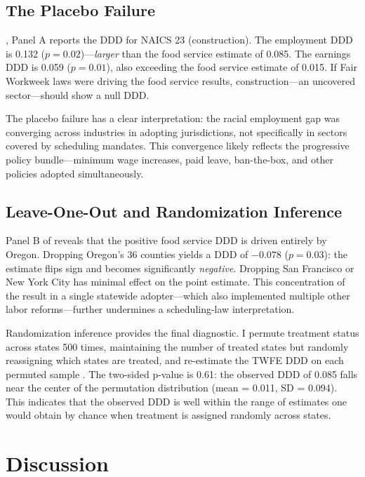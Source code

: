 \documentclass[12pt]{article}
\begin{document}


\subsection{The Placebo Failure}

, Panel A reports the DDD for NAICS 23 (construction). The employment DDD is 0.132 ($p = 0.02$)---\textit{larger} than the food service estimate of 0.085. The earnings DDD is 0.059 ($p = 0.01$), also exceeding the food service estimate of 0.015. If Fair Workweek laws were driving the food service results, construction---an uncovered sector---should show a null DDD.

The placebo failure has a clear interpretation: the racial employment gap was converging across industries in adopting jurisdictions, not specifically in sectors covered by scheduling mandates. This convergence likely reflects the progressive policy bundle---minimum wage increases, paid leave, ban-the-box, and other policies adopted simultaneously.

\subsection{Leave-One-Out and Randomization Inference}

Panel B of  reveals that the positive food service DDD is driven entirely by Oregon. Dropping Oregon's 36 counties yields a DDD of $-0.078$ ($p = 0.03$): the estimate flips sign and becomes significantly \textit{negative}. Dropping San Francisco or New York City has minimal effect on the point estimate. This concentration of the result in a single statewide adopter---which also implemented multiple other labor reforms---further undermines a scheduling-law interpretation.

Randomization inference provides the final diagnostic. I permute treatment status across states 500 times, maintaining the number of treated states but randomly reassigning which states are treated, and re-estimate the TWFE DDD on each permuted sample \citep{young2019}. The two-sided p-value is 0.61: the observed DDD of 0.085 falls near the center of the permutation distribution (mean = 0.011, SD = 0.094). This indicates that the observed DDD is well within the range of estimates one would obtain by chance when treatment is assigned randomly across states.




\section{Discussion}
\end{document}
